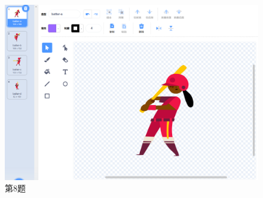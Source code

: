 \documentclass[10pt, a4paper]{article}
\begin{document}
\begin{enumerate}
        \begin{figure}[htbp]
            \centering
            \begin{minipage}[t]{.3\textwidth}
                \centering
                \includegraphics[width=\textwidth]{8.png}
                \caption*{第8题}
            \end{minipage}
            \begin{minipage}[t]{.1\textwidth}
                \centering

\end{minipage}
\end{figure}
\end{enumerate}
\end{document}
